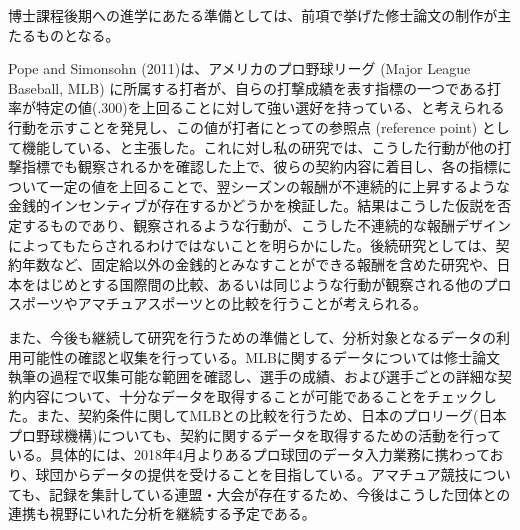 \documentclass[dvipdfmx, 12pt]{jsarticle}
\begin{document}
博士課程後期への進学にあたる準備としては、前項で挙げた修士論文の制作が主たるものとなる。

Pope and Simonsohn (2011)は、アメリカのプロ野球リーグ (Major League Baseball, MLB) に所属する打者が、自らの打撃成績を表す指標の一つである打率が特定の値(.300)を上回ることに対して強い選好を持っている、と考えられる行動を示すことを発見し、この値が打者にとっての参照点 (reference point) として機能している、と主張した。これに対し私の研究では、こうした行動が他の打撃指標でも観察されるかを確認した上で、彼らの契約内容に着目し、各の指標について一定の値を上回ることで、翌シーズンの報酬が不連続的に上昇するような金銭的インセンティブが存在するかどうかを検証した。結果はこうした仮説を否定するものであり、観察されるような行動が、こうした不連続的な報酬デザインによってもたらされるわけではないことを明らかにした。後続研究としては、契約年数など、固定給以外の金銭的とみなすことができる報酬を含めた研究や、日本をはじめとする国際間の比較、あるいは同じような行動が観察される他のプロスポーツやアマチュアスポーツとの比較を行うことが考えられる。

また、今後も継続して研究を行うための準備として、分析対象となるデータの利用可能性の確認と収集を行っている。MLBに関するデータについては修士論文執筆の過程で収集可能な範囲を確認し、選手の成績、および選手ごとの詳細な契約内容について、十分なデータを取得することが可能であることをチェックした。また、契約条件に関してMLBとの比較を行うため、日本のプロリーグ(日本プロ野球機構)についても、契約に関するデータを取得するための活動を行っている。具体的には、2018年4月よりあるプロ球団のデータ入力業務に携わっており、球団からデータの提供を受けることを目指している。アマチュア競技についても、記録を集計している連盟・大会が存在するため、今後はこうした団体との連携も視野にいれた分析を継続する予定である。
\end{document}
